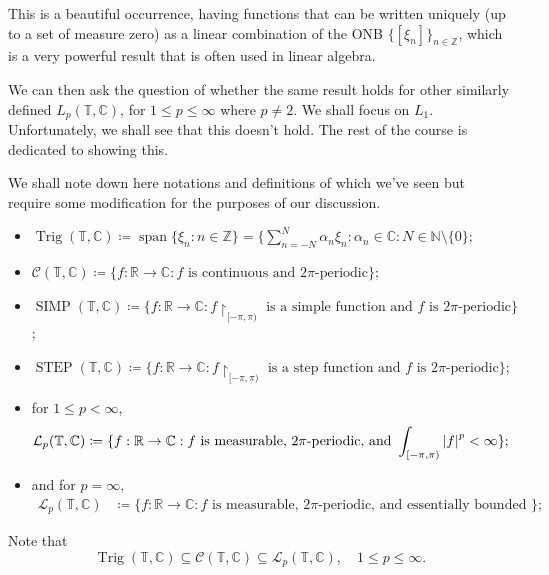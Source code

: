 \documentclass[notoc,notitlepage]{tufte-book}
\DeclareMathOperator{\SIMP}{SIMP}
\DeclareMathOperator{\STEP}{STEP}
\DeclareMathOperator{\Span}{span}
\DeclareMathOperator{\Trig}{Trig}
\begin{document}
\begin{note}
  This is a beautiful occurrence, having functions that can be
  written uniquely (up to a set of measure zero) as a linear
  combination of the ONB $\{[\xi_n]\}_{n \in \mathbb{Z}}$,
  which is a very powerful result that is often used in linear algebra.
\end{note}

We can then ask the question of whether the same result holds for other
similarly defined $L_p(\mathbb{T}, \mathbb{C})$, for $1 \leq p \leq \infty$
where $p \neq 2$. We shall focus on $L_1$.
Unfortunately, we shall see that this doesn't hold.
The rest of the course is dedicated to showing this.

\begin{fullwidth}
\begin{notation}
  We shall note down here notations and definitions of which we've
  seen but require some modification for the purposes of our discussion.
  \begin{itemize}
    \item $\Trig(\mathbb{T}, \mathbb{C})
      \coloneqq \Span \{ \xi_n : n \in \mathbb{Z} \}
      = \{ \sum_{n=-N}^{N} \alpha_n \xi_n
        : \alpha_n \in \mathbb{C} : N \in \mathbb{N} \setminus \{ 0 \}$;
      \item $\mathcal{C}(\mathbb{T}, \mathbb{C})
        \coloneqq \{ f : \mathbb{R} \to \mathbb{C} : f
        \text{ is continuous and } 2 \pi \text{-periodic} \}$;
      \item $\SIMP(\mathbb{T}, \mathbb{C})
        \coloneqq \{ f : \mathbb{R} \to \mathbb{C} :
          f \restriction_{[-\pi, \pi)} \text{ is a simple function
        and } f \text{ is } 2 \pi \text{-periodic} \}$;
      \item $\STEP(\mathbb{T}, \mathbb{C})
        \coloneqq \{ f : \mathbb{R} \to \mathbb{C} :
          f \restriction_{[-\pi, \pi)} \text{ is a step function
        and } f \text{ is } 2 \pi \text{-periodic} \}$;
      \item for $1 \leq p < \infty$,
        \begin{align*}
          \mathcal{L}_p(\mathbb{T}, \mathbb{C})
          &\coloneqq \{ f : \mathbb{R} \to \mathbb{C} :
            f \text{ is measurable, } 2 \pi \text{-periodic, 
          and } \int_{[-\pi, \pi)} \left|f\right|^p < \infty \};
        \end{align*}
      \item and for $p = \infty$,
        \begin{align*}
          \mathcal{L}_p(\mathbb{T}, \mathbb{C})
          &\coloneqq \{ f : \mathbb{R} \to \mathbb{C} :
            f \text{ is measurable, } 2 \pi \text{-periodic, 
          and essentially bounded } \};
        \end{align*}
  \end{itemize}
  Note that
  \begin{equation*}
    \Trig(\mathbb{T}, \mathbb{C}) \subseteq \mathcal{C}(\mathbb{T}, \mathbb{C})
    \subseteq \mathcal{L}_p(\mathbb{T}, \mathbb{C}), \quad 1 \leq p \leq \infty.
  \end{equation*}
\end{notation}
\end{fullwidth}
\end{document}
